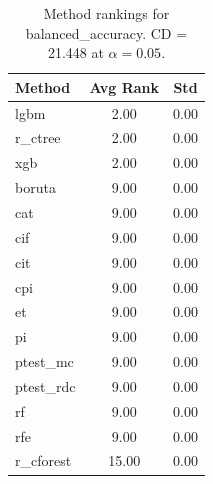 \begin{table}[h]
\centering
\caption{Method rankings for balanced_accuracy. CD = 21.448 at $\alpha=0.05$.}
\label{tab:ranks_balanced_accuracy}
\begin{tabular}{lcc}
\toprule
Method & Avg Rank & Std \\
\midrule
lgbm & 2.00 & 0.00 \\
r_ctree & 2.00 & 0.00 \\
xgb & 2.00 & 0.00 \\
boruta & 9.00 & 0.00 \\
cat & 9.00 & 0.00 \\
cif & 9.00 & 0.00 \\
cit & 9.00 & 0.00 \\
cpi & 9.00 & 0.00 \\
et & 9.00 & 0.00 \\
pi & 9.00 & 0.00 \\
ptest_mc & 9.00 & 0.00 \\
ptest_rdc & 9.00 & 0.00 \\
rf & 9.00 & 0.00 \\
rfe & 9.00 & 0.00 \\
r_cforest & 15.00 & 0.00 \\
\bottomrule
\end{tabular}
\end{table}